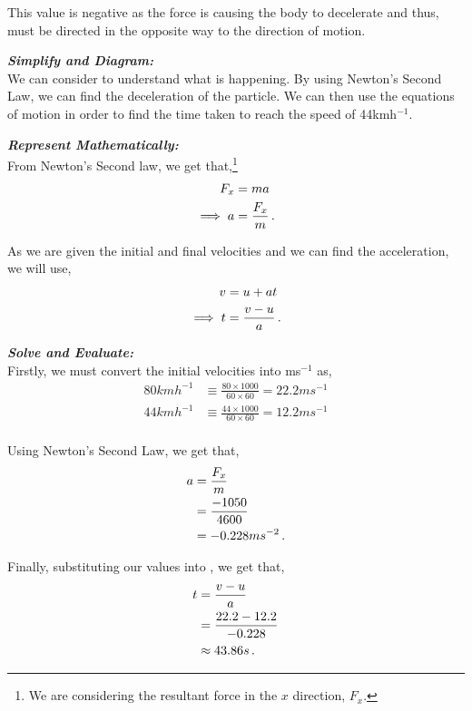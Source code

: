 \begin{subquestions}
\begin{subsubquestions}
This value is negative as the force is causing the body to decelerate and thus, must be directed in the opposite way to the direction of motion.


\subsubquestion
\textbf{\textit{Simplify and Diagram:}} \\
We can consider  to understand what is happening. By using Newton's Second Law, we can find the deceleration of the particle. We can then use the equations of motion in order to find the time taken to reach the speed of 44kmh$^{-1}$.




\textbf{\textit{Represent Mathematically:}} \\
From Newton's Second law, we get that,\footnote{We are considering the resultant force in the $x$ direction, $F_x$.}
\begin{align}
	F_x & = ma \nonumber \\
	\implies a & = \frac{F_x}{m} \,.
\end{align}

As we are given the initial and final velocities and we can find the acceleration, we will use,
\begin{align}
	v & = u + at \nonumber \\
	\implies t & = \frac{v-u}{a} \label{2016:q5:MotionEqn}\,.
\end{align}




\textbf{\textit{Solve and Evaluate:}} \\
Firstly, we must convert the initial velocities into ms$^{-1}$ as,
\begin{align}
	80kmh^{-1} & \equiv \frac{80 \times 1000}{60 \times 60} = 22.2ms^{-1} \\
	44kmh^{-1} & \equiv \frac{44 \times 1000}{60 \times 60} = 12.2ms^{-1} \\
\end{align}

Using Newton's Second Law, we get that,
\begin{align}
	a & = \frac{F_x}{m} \nonumber \\
	  & = \frac{-1050}{4600} \nonumber \\
	  & = -0.228ms^{-2} \,.
\end{align}

Finally, substituting our values into , we get that,
\begin{align}
	t & = \frac{v-u}{a} \nonumber \\
	  & = \frac{22.2-12.2}{-0.228} \nonumber \\
	  & \approx 43.86s \,.
\end{align}

\end{subsubquestions}

\end{subquestions}
